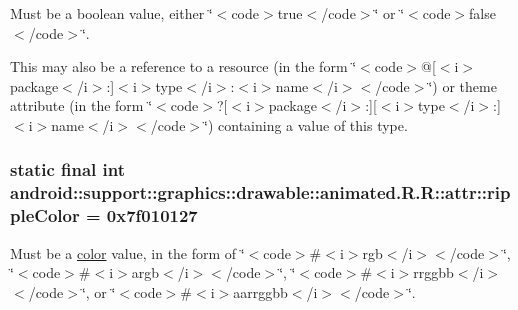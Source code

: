 Must be a boolean value, either \char`\"{}$<$code$>$true$<$/code$>$\char`\"{} or \char`\"{}$<$code$>$false$<$/code$>$\char`\"{}. 

This may also be a reference to a resource (in the form \char`\"{}$<$code$>$@\mbox{[}$<$i$>$package$<$/i$>$:\mbox{]}$<$i$>$type$<$/i$>$:$<$i$>$name$<$/i$>$$<$/code$>$\char`\"{}) or theme attribute (in the form \char`\"{}$<$code$>$?\mbox{[}$<$i$>$package$<$/i$>$:\mbox{]}\mbox{[}$<$i$>$type$<$/i$>$:\mbox{]}$<$i$>$name$<$/i$>$$<$/code$>$\char`\"{}) containing a value of this type. \hypertarget{classandroid_1_1support_1_1graphics_1_1drawable_1_1animated_1_1_r_1_1attr_6b03469d7fa93759fe7a3778e2e40753}{
\subsubsection[{rippleColor}]{\setlength{\rightskip}{0pt plus 5cm}static final int android::support::graphics::drawable::animated.R.R::attr::rippleColor = 0x7f010127}}
\label{classandroid_1_1support_1_1graphics_1_1drawable_1_1animated_1_1_r_1_1attr_6b03469d7fa93759fe7a3778e2e40753}


Must be a \hyperlink{classandroid_1_1support_1_1graphics_1_1drawable_1_1animated_1_1_r_1_1color}{color} value, in the form of \char`\"{}$<$code$>$\#$<$i$>$rgb$<$/i$>$$<$/code$>$\char`\"{}, \char`\"{}$<$code$>$\#$<$i$>$argb$<$/i$>$$<$/code$>$\char`\"{}, \char`\"{}$<$code$>$\#$<$i$>$rrggbb$<$/i$>$$<$/code$>$\char`\"{}, or \char`\"{}$<$code$>$\#$<$i$>$aarrggbb$<$/i$>$$<$/code$>$\char`\"{}. 

